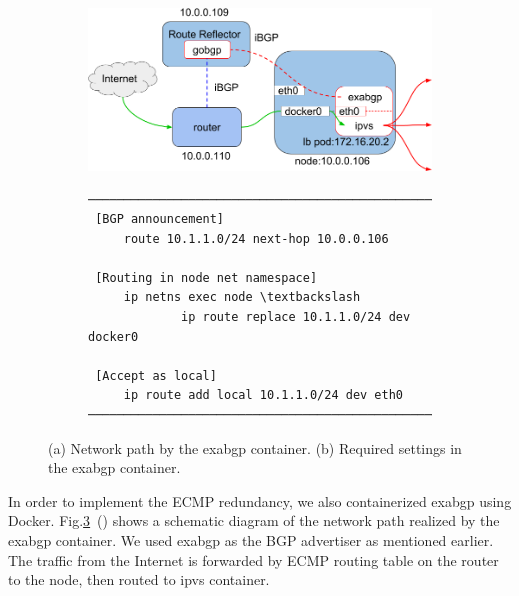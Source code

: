 \begin{figure}[tb]

  \begin{subfigure}[t]{\columnwidth}
    \includegraphics[width=0.9\columnwidth]{Figs/exabgp}
    \caption{}
    \label{fig:exabgp_schem}
  \end{subfigure}

  \par\bigskip

  \begin{subfigure}[t]{\columnwidth}

\centering
\begin{Verbatim}[commandchars=\\\{\}]
───────────────────────────────────────────────────────
 [BGP announcement]
     route 10.1.1.0/24 next-hop 10.0.0.106 

 [Routing in node net namespace]
     ip netns exec node \textbackslash
             ip route replace 10.1.1.0/24 dev docker0
      
 [Accept as local]
     ip route add local 10.1.1.0/24 dev eth0 
───────────────────────────────────────────────────────
\end{Verbatim}

    \caption{}
    \label{fig:exabgp_setting}
  \end{subfigure}

  \caption{
    (a) Network path by the exabgp container. (b) Required settings in the exabgp container.
  }
  \label{fig:exabgp}
\end{figure}

In order to implement the ECMP redundancy, we also containerized exabgp using Docker.
Fig.\ref{fig:exabgp}~() shows a schematic diagram of the network path realized by the exabgp container.
We used exabgp as the BGP advertiser as mentioned earlier.
The traffic from the Internet is forwarded by ECMP routing table on the router to the node, then routed to ipvs container.

